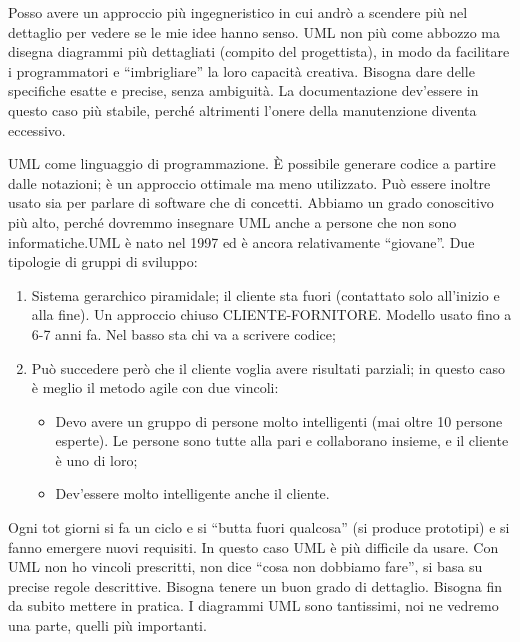 Posso avere un approccio più ingegneristico in cui andrò a scendere più nel dettaglio per vedere se le mie idee hanno senso. UML non più come abbozzo ma disegna diagrammi più dettagliati (compito del progettista), in modo da facilitare i programmatori e ``imbrigliare'' la loro capacità creativa. Bisogna dare delle specifiche esatte e precise, senza ambiguità. La documentazione dev'essere in questo caso più stabile, perché altrimenti l'onere della manutenzione diventa eccessivo.

UML come linguaggio di programmazione. È possibile generare codice a partire dalle notazioni; è un approccio ottimale ma meno utilizzato. Può essere inoltre usato sia per parlare di software che di concetti. Abbiamo un grado conoscitivo più alto, perché dovremmo insegnare UML anche a persone che non sono informatiche.UML è nato nel 1997 ed è ancora relativamente “giovane”. Due tipologie di gruppi di sviluppo: 

\begin{enumerate}
\item Sistema gerarchico piramidale; il cliente sta fuori (contattato solo all'inizio e alla fine). Un approccio chiuso CLIENTE-FORNITORE. Modello usato fino a 6-7 anni fa. Nel basso sta chi va a scrivere codice;

\item Può succedere però che il cliente voglia avere risultati parziali; in questo caso è meglio il metodo agile con due vincoli:
\begin{itemize}
\item Devo avere un gruppo di persone molto intelligenti (mai oltre 10 persone esperte). Le persone sono tutte alla pari e collaborano insieme, e il cliente è uno di loro;
\item Dev'essere molto intelligente anche il cliente.
\end{itemize}
\end{enumerate}

Ogni tot giorni si fa un ciclo e si ``butta fuori qualcosa'' (si produce prototipi) e si fanno emergere 
nuovi requisiti. In questo caso UML è più difficile da usare. Con UML non ho vincoli prescritti, non dice ``cosa non dobbiamo fare'', si basa su precise regole descrittive. Bisogna tenere un buon grado di dettaglio. Bisogna fin da subito mettere in pratica. I diagrammi UML sono tantissimi, noi ne vedremo una parte, quelli più importanti.

